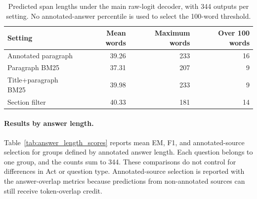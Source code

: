 \documentclass[pdflatex,sn-basic]{sn-jnl}%
\theoremstyle{thmstyleone}%
\theoremstyle{thmstyletwo}%
\theoremstyle{thmstylethree}%
\begin{document}
\begin{table}[!htbp]
    \caption{Predicted span lengths under the main raw-logit decoder, with
    344 outputs per setting. No annotated-answer percentile is used to select
    the 100-word threshold.}
    \label{tab:prediction_lengths}
    \centering
    \small
    \begin{tabular}{@{}lrrr@{}}
        \toprule
        Setting & Mean words & Maximum words & Over 100 words \\
        \midrule
        Annotated paragraph  & 39.26 & 233 & 16 \\
        Paragraph BM25       & 37.31 & 207 & 9 \\
        Title+paragraph BM25 & 39.98 & 233 & 9 \\
        Section filter       & 40.33 & 181 & 14 \\
        \bottomrule
    \end{tabular}
\end{table}

\paragraph*{Results by answer length.}
Table~\ref{tab:answer_length_scores} reports mean EM, F1, and
annotated-source selection for groups defined by annotated answer length.
Each question belongs to one group, and the counts sum to 344. These
comparisons do not control for differences in Act or question type.
Annotated-source selection is reported with the answer-overlap metrics because
predictions from non-annotated sources can still receive token-overlap credit.
\end{document}
